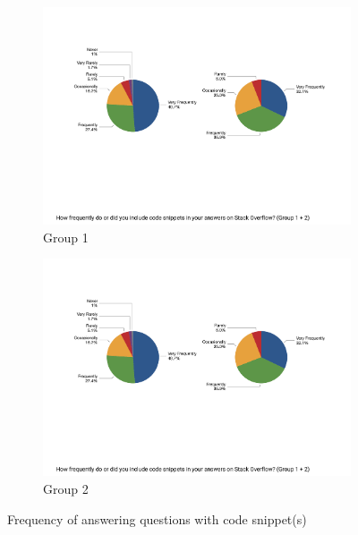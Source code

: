 \documentclass{svjour3}                     %
\begin{document}
\begin{figure}
	\begin{subfigure}{.5\textwidth}
		\centering
		\includegraphics[width=\linewidth]{survey_answer_frequency_with_code_1}
		\caption{Group 1}
		\label{fig:survey_answer_frequency_with_code_1}
	\end{subfigure}%
	\begin{subfigure}{.5\textwidth}
		\centering
		\includegraphics[width=\linewidth]{survey_answer_frequency_with_code_2}
		\caption{Group 2}
		\label{fig:survey_answer_frequency_with_code_2}
	\end{subfigure}
	\caption{Frequency of answering questions with code snippet(s)}
	\label{fig:survey_answer_frequency_with_code}
\end{figure}
\end{document}
